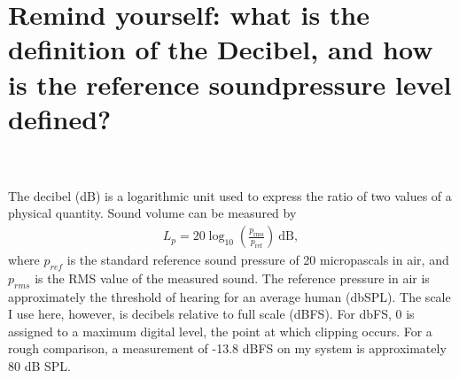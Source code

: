 \documentclass[onecolumn,10pt]{jhwhw}
\begin{document}
\part{Remind yourself: what is the definition of the Decibel, and how is the reference soundpressure level defined?}
\\
\\
\noindent The decibel (dB) is a logarithmic unit used to express the ratio of two values of a physical quantity. Sound volume can be measured by
\begin{align*}
L_p = 20 \log_{10}\!\left(\frac{p_{\mathrm{rms}}}{p_{\mathrm{ref}}}\right)\!~\mathrm{dB},
\end{align*}
where $p_{ref}$ is the standard reference sound pressure of 20 micropascals in air, and $p_{rms}$ is the RMS value of the measured sound. The reference pressure in air is approximately the threshold of hearing for an average human (dbSPL). The scale I use here, however, is decibels relative to full scale (dBFS). For dbFS, 0 is assigned to a maximum digital level, the point at which clipping occurs. For a rough comparison, a measurement of -13.8 dBFS on my system is approximately 80 dB SPL.
\end{document}
